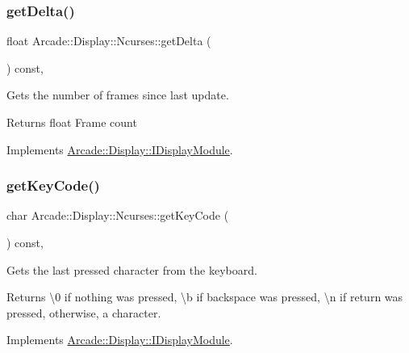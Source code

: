 \subsubsection{\texorpdfstring{getDelta()}{getDelta()}}
{\footnotesize\ttfamily float Arcade\+::\+Display\+::\+Ncurses\+::get\+Delta (\begin{DoxyParamCaption}{ }\end{DoxyParamCaption}) const\hspace{0.3cm}{\ttfamily [final]}, {\ttfamily [virtual]}}



Gets the number of frames since last update. 

\begin{DoxyReturn}{Returns}
float Frame count 
\end{DoxyReturn}


Implements \mbox{\hyperlink{classArcade_1_1Display_1_1IDisplayModule_aab078d82e6fdd32682553947c20226ac}{Arcade\+::\+Display\+::\+I\+Display\+Module}}.

\mbox{\label{classArcade_1_1Display_1_1Ncurses_a250dbb0610f79a7524ba5a926be750b6}} 
\subsubsection{\texorpdfstring{getKeyCode()}{getKeyCode()}}
{\footnotesize\ttfamily char Arcade\+::\+Display\+::\+Ncurses\+::get\+Key\+Code (\begin{DoxyParamCaption}{ }\end{DoxyParamCaption}) const\hspace{0.3cm}{\ttfamily [final]}, {\ttfamily [virtual]}}



Gets the last pressed character from the keyboard. 

\begin{DoxyReturn}{Returns}
\textbackslash{}0 if nothing was pressed, \textbackslash{}b if backspace was pressed, \textbackslash{}n if return was pressed, otherwise, a character. 
\end{DoxyReturn}


Implements \mbox{\hyperlink{classArcade_1_1Display_1_1IDisplayModule_a403f8a0f065dad707a881ef3cee79805}{Arcade\+::\+Display\+::\+I\+Display\+Module}}.

